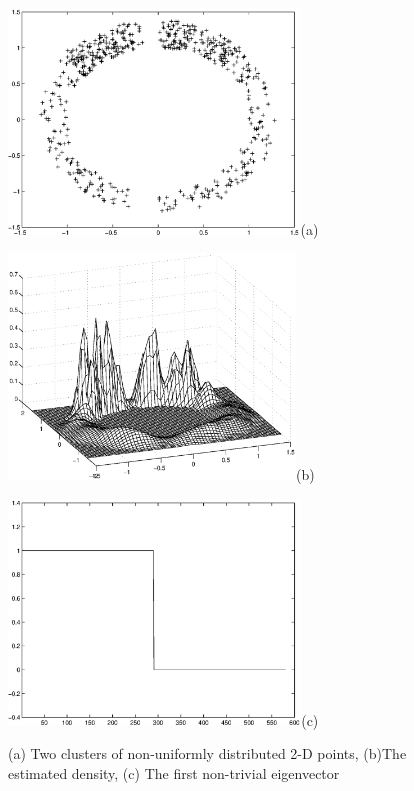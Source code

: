 \documentclass[12pt,letterpaper,doublespaced,ETD,dvips,proposal]{gtthesis}
\begin{document}
\begin{Body}
\begin{figure}[tb]
 \centerline{\includegraphics[height=6.0cm]{fig2a.eps}(a)}
 \centerline{\includegraphics[height=6.0cm]{fig2b.eps}(b)}
 \centerline{\includegraphics[height=6.0cm]{fig2c.eps}(c)}
\caption{(a) Two clusters of non-uniformly distributed 2-D points,
(b)The estimated density, (c) The first non-trivial eigenvector
\vspace{1.2cm}}
  \label{fig2}
\end{figure}


\end{Body}
\end{document}
